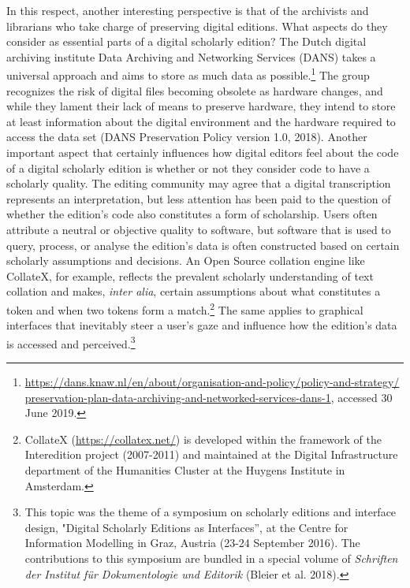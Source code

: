 \begin{paper}
In this respect, another interesting perspective is that of the
archivists and librarians who take charge of preserving digital
editions. What aspects do they consider as essential parts of a digital
scholarly edition? The Dutch digital archiving institute Data Archiving
and Networking Services (DANS) takes a universal approach and aims to
store as much data as possible.\footnote{\href{https://dans.knaw.nl/en/about/organisation-and-policy/policy-and-strategy/preservation-plan-data-archiving-and-networked-services-dans-1}{https://dans.knaw.nl/en/about/organisation-and-policy/policy-and-strategy/ preservation-plan-data-archiving-and-networked-services-dans-1}, accessed 30 June 2019.} The group recognizes the risk of digital files becoming obsolete as
hardware changes, and while they lament their lack of means to preserve
hardware, they intend to store at least information about the digital
environment and the hardware required to access the data set (DANS
Preservation Policy version 1.0, 2018). Another important aspect that
certainly influences how digital editors feel about the code of a
digital scholarly edition is whether or not they consider code to have a
scholarly quality. The editing community may agree that a digital
transcription represents an interpretation, but less attention has been
paid to the question of whether the edition's code also constitutes a
form of scholarship. Users often attribute a neutral or objective
quality to software, but software that is used to query, process, or
analyse the edition's data is often constructed based on certain
scholarly assumptions and decisions. An Open Source collation engine
like CollateX, for example, reflects the prevalent scholarly
understanding of text collation and makes, \emph{inter alia}, certain
assumptions about what constitutes a token and when two tokens form a
match.\footnote{CollateX
  (\href{https://collatex.net/}{{https://collatex.net/}}) is developed
  within the framework of the Interedition project (2007-2011) and
  maintained at the Digital Infrastructure department of the Humanities
  Cluster at the Huygens Institute in Amsterdam.} The same applies to graphical interfaces that
inevitably steer a user's gaze and influence how the edition's data is
accessed and perceived.\footnote{This topic was the theme of a symposium
  on scholarly editions and interface design, "Digital Scholarly
  Editions as Interfaces'', at the Centre for Information Modelling in
  Graz, Austria (23-24 September 2016). The contributions to this
  symposium are bundled in a special volume of \emph{Schriften der
  Institut für Dokumentologie und Editorik} (Bleier et al. 2018).}


\end{paper}
